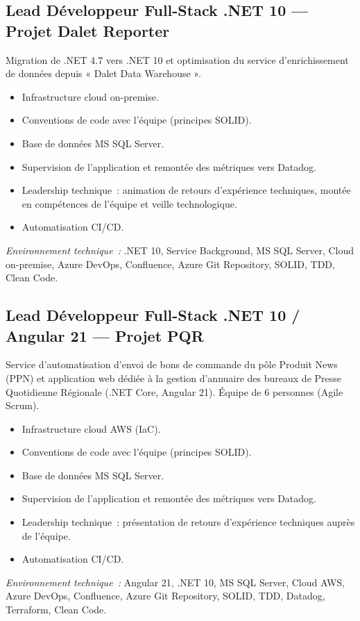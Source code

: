 \documentclass[10pt,a4paper]{article}
\begin{document}
\vspace{6pt}

\subsection*{Lead Développeur Full-Stack .NET 10 --- Projet Dalet Reporter}
\color{darkgray}
Migration de .NET 4.7 vers .NET 10 et optimisation du service d'enrichissement de données depuis « Dalet Data Warehouse ».
\begin{itemize}
  \item Infrastructure cloud on-premise.
  \item Conventions de code avec l'équipe (principes SOLID).
  \item Base de données MS SQL Server.
  \item Supervision de l'application et remontée des métriques vers Datadog.
  \item Leadership technique~: animation de retours d'expérience techniques, montée en compétences de l'équipe et veille technologique.
  \item Automatisation CI/CD.
\end{itemize}
\textit{Environnement technique~:} .NET 10, Service Background, MS SQL Server, Cloud on-premise, Azure DevOps, Confluence, Azure Git Repository, SOLID, TDD, Clean Code.

\vspace{6pt}

\subsection*{Lead Développeur Full-Stack .NET 10 / Angular 21 --- Projet PQR}
\color{darkgray}
Service d'automatisation d'envoi de bons de commande du pôle Produit News (PPN) et application web dédiée à la gestion d'annuaire des bureaux de Presse Quotidienne Régionale (.NET Core, Angular 21). Équipe de 6 personnes (Agile Scrum).
\begin{itemize}
  \item Infrastructure cloud AWS (IaC).
  \item Conventions de code avec l'équipe (principes SOLID).
  \item Base de données MS SQL Server.
  \item Supervision de l'application et remontée des métriques vers Datadog.
  \item Leadership technique~: présentation de retours d'expérience techniques auprès de l'équipe.
  \item Automatisation CI/CD.
\end{itemize}
\textit{Environnement technique~:} Angular 21, .NET 10, MS SQL Server, Cloud AWS, Azure DevOps, Confluence, Azure Git Repository, SOLID, TDD, Datadog, Terraform, Clean Code.
\end{document}
